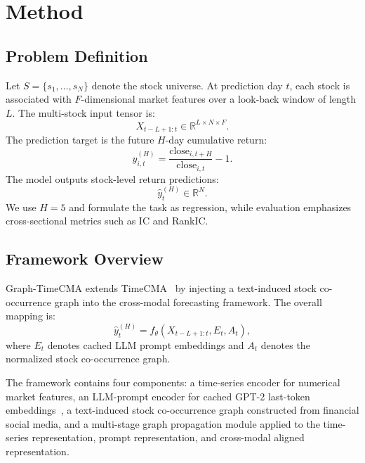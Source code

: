 \documentclass[runningheads]{llncs}
\begin{document}
\section{Method}

\subsection{Problem Definition}

Let $S = \{s_1, \dots, s_N\}$ denote the stock universe. At prediction day $t$, each stock is associated with $F$-dimensional market features over a look-back window of length $L$. The multi-stock input tensor is:
\begin{equation}
X_{t-L+1:t} \in \mathbb{R}^{L \times N \times F}.
\end{equation}
The prediction target is the future $H$-day cumulative return:
\begin{equation}
y^{(H)}_{i,t} = \frac{\text{close}_{i,t+H}}{\text{close}_{i,t}} - 1.
\end{equation}
The model outputs stock-level return predictions:
\begin{equation}
\hat{y}^{(H)}_t \in \mathbb{R}^{N}.
\end{equation}
We use $H = 5$ and formulate the task as regression, while evaluation emphasizes cross-sectional metrics such as IC and RankIC.

\subsection{Framework Overview}

Graph-TimeCMA extends TimeCMA~\cite{liu2025timecma} by injecting a text-induced stock co-occurrence graph into the cross-modal forecasting framework. The overall mapping is:
\begin{equation}
\hat{y}^{(H)}_t = f_\theta(X_{t-L+1:t}, E_t, A_t),
\end{equation}
where $E_t$ denotes cached LLM prompt embeddings and $A_t$ denotes the normalized stock co-occurrence graph.

The framework contains four components: a time-series encoder for numerical market features, an LLM-prompt encoder for cached GPT-2 last-token embeddings~\cite{radford2019language}, a text-induced stock co-occurrence graph constructed from financial social media, and a multi-stage graph propagation module applied to the time-series representation, prompt representation, and cross-modal aligned representation.
\end{document}
